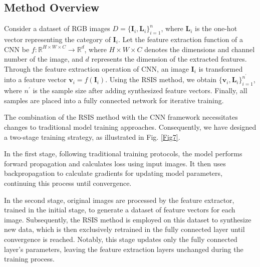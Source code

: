 \documentclass[final,3p,times]{elsarticle}
\begin{document}
\subsection{Method Overview}
Consider a dataset of RGB images $D=\{\boldsymbol{I}_i,\boldsymbol{L}_i \}_
{i=1}^n$, where $\boldsymbol{L}_i$ is the one-hot vector representing the category of $\boldsymbol{I}_i$. Let the feature extraction function of a CNN be 
$f:\mathbb{R}^{H\times W\times C}\rightarrow \mathbb{R}^d$, 
where $H\times W\times C$ denotes the dimensions and channel 
number of the image, and $d$ represents the dimension of the 
extracted features. Through the feature extraction operation of 
CNN, an image $\boldsymbol{I}_i$ is transformed into a feature 
vector $\boldsymbol{v}_i=f(\boldsymbol{I}_i)$. Using the RSIS 
method, we obtain $\{\boldsymbol{v}_i,\boldsymbol{L}_i\}_{i=1}^{n^\prime}$, 
where $n^\prime$ is the sample size after adding synthesized 
feature vectors. Finally, all samples are placed into a fully 
connected network for iterative training. 

The combination of the RSIS method with the CNN framework 
necessitates changes to traditional model training approaches. 
Consequently, we have designed a two-stage training strategy, as 
illustrated in Fig. \ref{Fig7}.

In the first stage, following traditional training protocols, 
the model performs forward propagation and calculates loss using 
input images. It then uses backpropagation to calculate gradients 
for updating model parameters, continuing this process until 
convergence.

In the second stage, original images are processed by the feature 
extractor, trained in the initial stage, to generate a dataset of 
feature vectors for each image. Subsequently, the RSIS method is 
employed on this dataset to synthesize new data, which is then 
exclusively retrained in the fully connected layer until 
convergence is reached. Notably, this stage updates only the 
fully connected layer's parameters, leaving the feature extraction 
layers unchanged during the training process.
\end{document}
